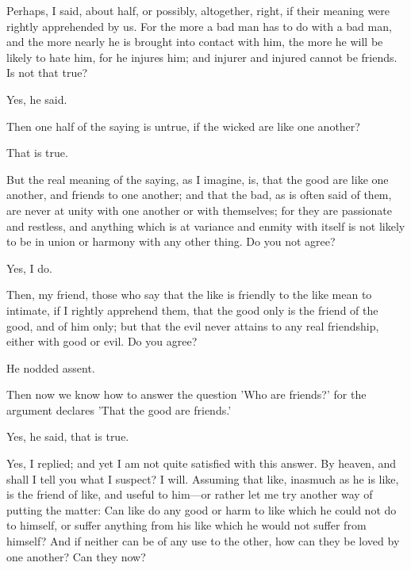 \documentclass[11pt,letter]{article}
\begin{document}
\par  Perhaps, I said, about half, or possibly, altogether, right, if their meaning were rightly apprehended by us. For the more a bad man has to do with a bad man, and the more nearly he is brought into contact with him, the more he will be likely to hate him, for he injures him; and injurer and injured cannot be friends. Is not that true?

\par  Yes, he said.

\par  Then one half of the saying is untrue, if the wicked are like one another?

\par  That is true.

\par  But the real meaning of the saying, as I imagine, is, that the good are like one another, and friends to one another; and that the bad, as is often said of them, are never at unity with one another or with themselves; for they are passionate and restless, and anything which is at variance and enmity with itself is not likely to be in union or harmony with any other thing. Do you not agree?

\par  Yes, I do.

\par  Then, my friend, those who say that the like is friendly to the like mean to intimate, if I rightly apprehend them, that the good only is the friend of the good, and of him only; but that the evil never attains to any real friendship, either with good or evil. Do you agree?

\par  He nodded assent.

\par  Then now we know how to answer the question 'Who are friends?' for the argument declares 'That the good are friends.'

\par  Yes, he said, that is true.

\par  Yes, I replied; and yet I am not quite satisfied with this answer. By heaven, and shall I tell you what I suspect? I will. Assuming that like, inasmuch as he is like, is the friend of like, and useful to him—or rather let me try another way of putting the matter: Can like do any good or harm to like which he could not do to himself, or suffer anything from his like which he would not suffer from himself? And if neither can be of any use to the other, how can they be loved by one another? Can they now?
\end{document}
